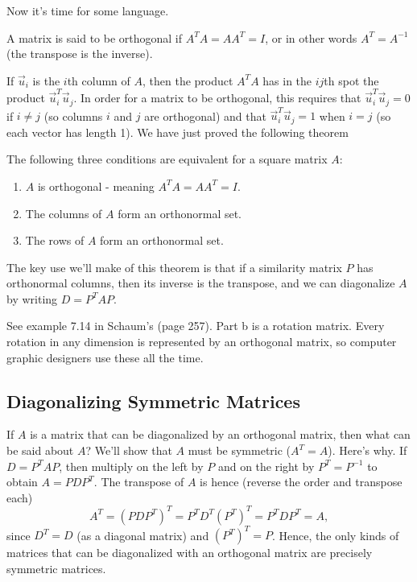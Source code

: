 Now it's time for some language.
\begin{definition}
A matrix is said to be orthogonal if $A^TA=AA^T=I$, or in other words $A^T=A^{-1}$ (the transpose is the inverse).  
\end{definition}
 If $\vec u_i$ is the $i$th column of $A$, then the product $A^TA$ has in  the $ij$th spot the product $\vec u_i^T \vec u_j$.  In order for a matrix to be orthogonal, this requires that $\vec u_i^T \vec u_j=0$ if $i\neq j$ (so columns $i$ and $j$ are orthogonal) and that $\vec u_i^T \vec u_j=1$ when $i=j$ (so each vector has length 1).  We have just proved the following theorem
\begin{theorem}
The following three conditions are equivalent for a square matrix $A$:
\begin{enumerate}
	\item $A$ is orthogonal - meaning $A^TA=AA^T=I$.
	\item The columns of $A$ form an orthonormal set.
	\item The rows of $A$ form an orthonormal set.
\end{enumerate}
\end{theorem}
The key use we'll make of this theorem is that if a similarity matrix $P$ has orthonormal columns, then its inverse is the transpose, and we can diagonalize $A$ by writing $D=P^TAP$. 

\begin{example}
See example 7.14 in Schaum's (page 257). Part b is a rotation matrix. Every rotation in any dimension is represented by an orthogonal matrix, so computer graphic designers use these all the time.
\end{example}


\subsection{Diagonalizing Symmetric Matrices}

If $A$ is a matrix that can be diagonalized by an orthogonal matrix, then what can be said about $A$?  We'll show that $A$ must be symmetric ($A^T=A$).  Here's why.  If $D = P^T A P$, then multiply on the left by $P$ and on the right by $P^T=P^{-1}$ to obtain $A=P DP^T$. The transpose of $A$ is hence (reverse the order and transpose each) 
$$A^T = (PDP^T)^T = P^T D^T (P^T)^T = P^T D P^T = A,$$ since $D^T=D$ (as a diagonal matrix) and $(P^T)^T=P$.
Hence, the only kinds of matrices that can be diagonalized with an orthogonal matrix are precisely symmetric matrices.


